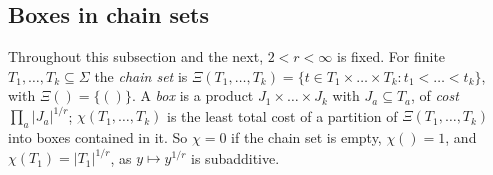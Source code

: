 \documentclass[11pt]{amsart}
\theoremstyle{definition}
\theoremstyle{remark}
\numberwithin{equation}{section}
\newcommand{\abs}[1]{\lvert #1\rvert}
\theoremstyle{plain}
\theoremstyle{definition}
\theoremstyle{plain}
\begin{document}
\subsection{Boxes in chain sets}\label{ord:ssec:boxes}

Throughout this subsection and the next, $2<r<\infty$ is fixed. For finite $T_1,\dots,T_k\subseteq\Sigma$ the
\emph{chain set} is $\Xi(T_1,\dots,T_k)=\{t\in T_1\times\dots\times T_k:t_1<\dots<t_k\}$, with $\Xi()=\{()\}$. A
\emph{box} is a product $J_1\times\dots\times J_k$ with $J_a\subseteq T_a$, of \emph{cost} $\prod_a\abs{J_a}^{1/r}$;
$\chi(T_1,\dots,T_k)$ is the least total cost of a partition of $\Xi(T_1,\dots,T_k)$ into boxes contained in it. So
$\chi=0$ if the chain set is empty, $\chi()=1$, and $\chi(T_1)=\abs{T_1}^{1/r}$, as $y\mapsto y^{1/r}$ is subadditive.
\end{document}

